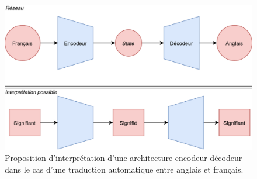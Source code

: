 \begin{figure}[h]
    \centering
    \includegraphics[width=\linewidth]{results/deep-learning/explanations/EncodeurDecodeur.png}
    \caption{Proposition d'interprétation d'une architecture encodeur-décodeur dans le cas d'une traduction automatique entre anglais et français.}
    \label{fig:deep-learning:encoder-decoder}
\end{figure}
